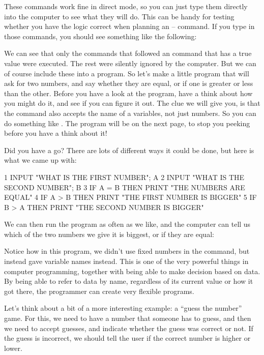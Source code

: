 \needspace{4cm}
These commands work fine in direct mode, so you can just type them
directly into the computer to see what they will do.  This can be
handy for testing whether you have the logic correct when planning an
 --  command.  If you type in those commands, you
should see something like the following:


We can see that only the  commands that followed an
 command that has a true value were executed. The rest
were silently ignored by the computer.  But we can of course include
these into a program. So let's make a little program that will ask
for two numbers, and say whether they are equal, or if one is greater
or less than the other.  Before you have a look at the program, have
a think about how you might do it, and see if you can figure it out.
The clue we will give you, is that the  command also accepts the name of
a variables, not just numbers. So you can do something like . The program will be on the next page, to stop you peeking before you
have a think about it!

\pagebreak

Did you have a go?  There are lots of different ways it could be done,
but here is what we came up with:

\begin{screenoutput}
1 INPUT "WHAT IS THE FIRST NUMBER"; A
2 INPUT "WHAT IS THE SECOND NUMBER"; B
3 IF A = B THEN PRINT "THE NUMBERS ARE EQUAL"
4 IF A > B THEN PRINT "THE FIRST NUMBER IS BIGGER"
5 IF B > A THEN PRINT "THE SECOND NUMBER IS BIGGER"
\end{screenoutput}

We can then run the program as often as we like, and the computer
can tell us which of the two numbers we give it is biggest, or if they
are equal:


Notice how in this program, we didn't use fixed numbers in the
 command, but instead gave variable names instead.  This is
one of the very powerful things in computer programming, together
with being able to make decision based on data. By being able to refer
to data by name, regardless of its current value or how it got there,
the programmer can create very flexible programs.

Let's think about a bit of a more interesting example: a ``guess the
number'' game.
For this, we need to have a number that someone has to guess, and then
we need to accept guesses, and indicate whether the guess was correct
or not. If the guess is incorrect, we should tell the user if the
correct number is higher or lower.


